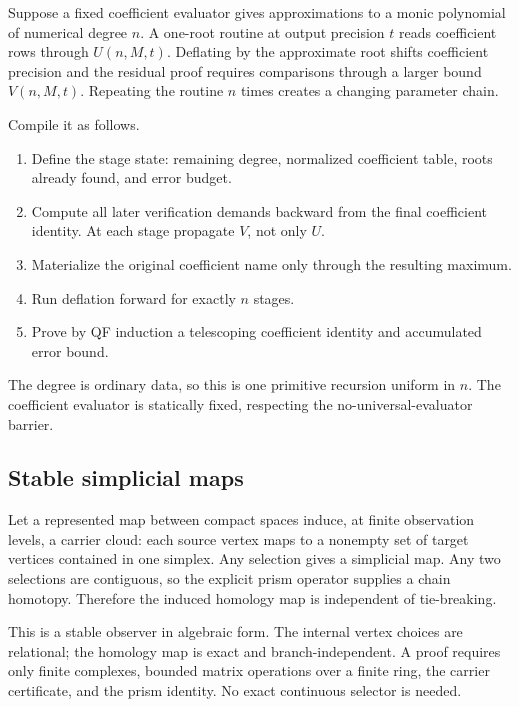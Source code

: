 Suppose a fixed coefficient evaluator gives approximations to a monic polynomial of
numerical degree \(n\).  A one-root routine at output precision \(t\) reads coefficient
rows through \(U(n,M,t)\).  Deflating by the approximate root shifts coefficient
precision and the residual proof requires comparisons through a larger bound
\(V(n,M,t)\).  Repeating the routine \(n\) times creates a changing parameter chain.

Compile it as follows.

\begin{enumerate}[label=\arabic*.,leftmargin=2.2em]
\item Define the stage state: remaining degree, normalized coefficient table, roots
already found, and error budget.
\item Compute all later verification demands backward from the final coefficient
identity.  At each stage propagate \(V\), not only \(U\).
\item Materialize the original coefficient name only through the resulting maximum.
\item Run deflation forward for exactly \(n\) stages.
\item Prove by QF induction a telescoping coefficient identity and accumulated error
bound.
\end{enumerate}

The degree is ordinary data, so this is one primitive recursion uniform in \(n\).  The
coefficient evaluator is statically fixed, respecting the no-universal-evaluator
barrier.

\subsection{Stable simplicial maps}

Let a represented map between compact spaces induce, at finite observation levels, a
carrier cloud: each source vertex maps to a nonempty set of target vertices contained
in one simplex.  Any selection gives a simplicial map.  Any two selections are
contiguous, so the explicit prism operator supplies a chain homotopy.  Therefore the
induced homology map is independent of tie-breaking.

This is a stable observer in algebraic form.  The internal vertex choices are
relational; the homology map is exact and branch-independent.  A proof requires only
finite complexes, bounded matrix operations over a finite ring, the carrier
certificate, and the prism identity.  No exact continuous selector is needed.

